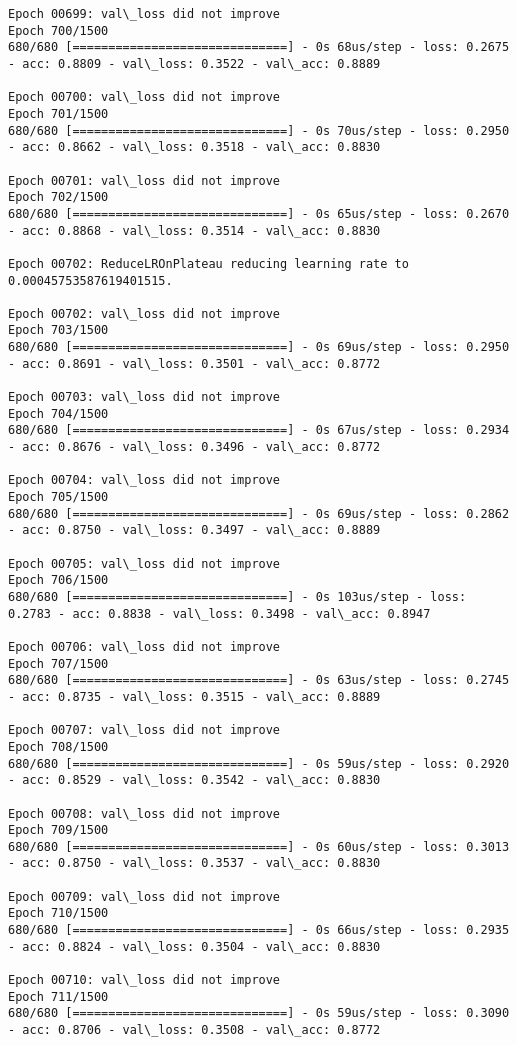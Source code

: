 \documentclass[11pt]{article}
\begin{document}
\begin{Verbatim}[commandchars=\\\{\}]
Epoch 00699: val\_loss did not improve
Epoch 700/1500
680/680 [==============================] - 0s 68us/step - loss: 0.2675 - acc: 0.8809 - val\_loss: 0.3522 - val\_acc: 0.8889

Epoch 00700: val\_loss did not improve
Epoch 701/1500
680/680 [==============================] - 0s 70us/step - loss: 0.2950 - acc: 0.8662 - val\_loss: 0.3518 - val\_acc: 0.8830

Epoch 00701: val\_loss did not improve
Epoch 702/1500
680/680 [==============================] - 0s 65us/step - loss: 0.2670 - acc: 0.8868 - val\_loss: 0.3514 - val\_acc: 0.8830

Epoch 00702: ReduceLROnPlateau reducing learning rate to 0.00045753587619401515.

Epoch 00702: val\_loss did not improve
Epoch 703/1500
680/680 [==============================] - 0s 69us/step - loss: 0.2950 - acc: 0.8691 - val\_loss: 0.3501 - val\_acc: 0.8772

Epoch 00703: val\_loss did not improve
Epoch 704/1500
680/680 [==============================] - 0s 67us/step - loss: 0.2934 - acc: 0.8676 - val\_loss: 0.3496 - val\_acc: 0.8772

Epoch 00704: val\_loss did not improve
Epoch 705/1500
680/680 [==============================] - 0s 69us/step - loss: 0.2862 - acc: 0.8750 - val\_loss: 0.3497 - val\_acc: 0.8889

Epoch 00705: val\_loss did not improve
Epoch 706/1500
680/680 [==============================] - 0s 103us/step - loss: 0.2783 - acc: 0.8838 - val\_loss: 0.3498 - val\_acc: 0.8947

Epoch 00706: val\_loss did not improve
Epoch 707/1500
680/680 [==============================] - 0s 63us/step - loss: 0.2745 - acc: 0.8735 - val\_loss: 0.3515 - val\_acc: 0.8889

Epoch 00707: val\_loss did not improve
Epoch 708/1500
680/680 [==============================] - 0s 59us/step - loss: 0.2920 - acc: 0.8529 - val\_loss: 0.3542 - val\_acc: 0.8830

Epoch 00708: val\_loss did not improve
Epoch 709/1500
680/680 [==============================] - 0s 60us/step - loss: 0.3013 - acc: 0.8750 - val\_loss: 0.3537 - val\_acc: 0.8830

Epoch 00709: val\_loss did not improve
Epoch 710/1500
680/680 [==============================] - 0s 66us/step - loss: 0.2935 - acc: 0.8824 - val\_loss: 0.3504 - val\_acc: 0.8830

Epoch 00710: val\_loss did not improve
Epoch 711/1500
680/680 [==============================] - 0s 59us/step - loss: 0.3090 - acc: 0.8706 - val\_loss: 0.3508 - val\_acc: 0.8772


\end{Verbatim}
\end{document}

